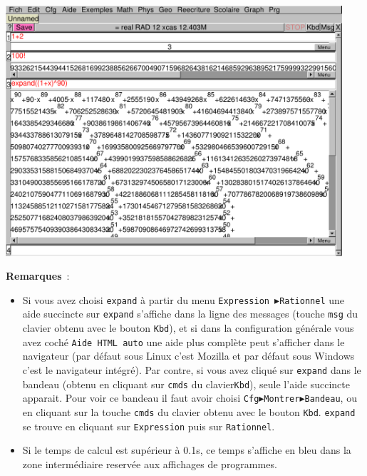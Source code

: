 \documentclass[a4paper,11pt]{article}
\begin{document}
\begin{center}\includegraphics[width=12.5cm]{windowinter}\end{center}
{\bf Remarques}~:
\begin{itemize}
\item Si vous avez choisi {\tt expand} \`a partir du  
menu {\tt Expression $\blacktriangleright$Rationnel} une aide succincte sur 
{\tt expand} s'affiche dans la ligne des messages (touche {\tt msg} du clavier 
obtenu avec le bouton {\tt Kbd}), et si dans la configuration g\'en\'erale vous
avez coch\'e {\tt Aide HTML auto} une aide plus compl\`ete peut
s'afficher dans le navigateur (par d\'efaut sous Linux c'est Mozilla  et
par d\'efaut sous Windows c'est le navigateur int\'egr\'e).
Par contre, si vous avez cliqu\'e sur {\tt expand} dans le 
bandeau (obtenu en cliquant sur {\tt cmds} du clavier{\tt Kbd}), seule l'aide 
succincte apparait. 
Pour voir ce bandeau il faut avoir choisi 
{\tt Cfg$\blacktriangleright$Montrer$\blacktriangleright$Bandeau}, 
ou en cliquant sur la touche {\tt cmds} du clavier obtenu avec le bouton
{\tt Kbd}. {\tt expand} se trouve en cliquant sur {\tt Expression} puis sur 
{\tt Rationnel}.
 \item Si le temps de calcul est sup\'erieur \`a
0.1s, ce temps s'affiche en bleu dans la zone interm\'ediaire
reserv\'ee aux affichages de programmes.
\end{itemize}
\end{document}

